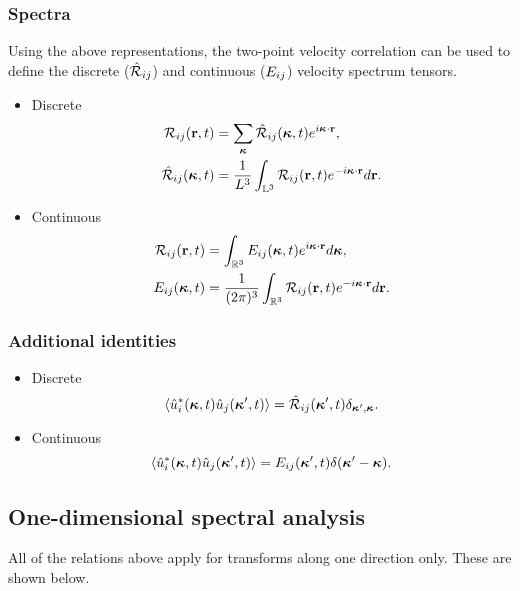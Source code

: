 \documentclass[oneside,a4paper,11pt]{report}
\begin{document}
\subsubsection{Spectra}
Using the above representations, the two-point velocity correlation can be used to define the discrete ($\hat{\mathcal{R}}_{ij}$) and continuous ($E_{ij}$) velocity spectrum tensors.
\begin{itemize}
\item Discrete
\begin{align}
\label{eq:tpvc_discrete}
\mathcal{R}_{ij}(\mathbf{r},t) & = \sum_{\boldsymbol\kappa} \hat{\mathcal{R}}_{ij}(\boldsymbol\kappa,t) e^{i \boldsymbol\kappa \cdot \mathbf{r}}, \\
\label{espec_discrete}
\hat{\mathcal{R}}_{ij}(\boldsymbol\kappa,t) & = \frac{1}{L^3} \int_{\mathbb{L}^3} \mathcal{R}_{ij}(\mathbf{r},t) e^{-i \boldsymbol\kappa \cdot \mathbf{r}} d\mathbf{r}.
\end{align}
\item Continuous
\begin{align}
\label{eq:tpvc_continuous}
\mathcal{R}_{ij}(\mathbf{r},t) &= \int_{\mathbb{R}^3} E_{ij}(\boldsymbol\kappa,t) e^{i \boldsymbol\kappa \cdot \mathbf{r}} d\boldsymbol\kappa, \\
\label{espec_continuous}
E_{ij}(\boldsymbol\kappa,t) & = \frac{1}{(2\pi)^3} \int_{\mathbb{R}^3} \mathcal{R}_{ij}(\mathbf{r},t) e^{-i\boldsymbol\kappa \cdot \mathbf{r}} d\mathbf{r}.
\end{align}
\end{itemize}

\subsubsection{Additional identities}
\begin{itemize}
\item Discrete
\begin{equation} 
\label{fromu_toE_disc}
\langle \hat{u}_i^*(\boldsymbol\kappa,t) \hat{u}_j(\boldsymbol\kappa',t) \rangle = \hat{\mathcal{R}}_{ij}(\boldsymbol\kappa',t) \delta_{\boldsymbol\kappa',\boldsymbol\kappa}.
\end{equation}
\item Continuous
\begin{equation} 
\label{fromu_toE_cont}
\langle \hat{u}_i^*(\boldsymbol\kappa,t) \hat{u}_j(\boldsymbol\kappa',t) \rangle = E_{ij}(\boldsymbol\kappa',t)\delta(\boldsymbol\kappa' - \boldsymbol\kappa).
\end{equation}
\end{itemize}

\subsection{One-dimensional spectral analysis}
All of the relations above apply for transforms along one direction only. These are shown below.
\end{document}

